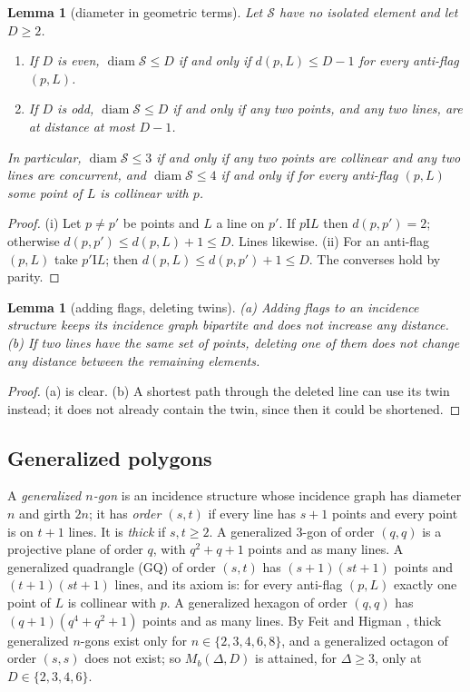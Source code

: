 \documentclass[11pt]{amsart}
\newtheorem{lemma}[theorem]{Lemma}
\theoremstyle{definition}
\theoremstyle{remark}
\numberwithin{equation}{section}
\newcommand{\I}{\mathrel{\mathrm I}}
\newcommand{\Mb}{M_b}
\newcommand{\diam}{\operatorname{diam}}
\newcommand{\cS}{\mathcal S}
\begin{document}
\begin{lemma}[diameter in geometric terms]\label{lem:diamgeom}
Let $\cS$ have no isolated element and let $D\ge2$.
\begin{enumerate}[label=(\roman*)]
\item If $D$ is even, $\diam\cS\le D$ if and only if $d(p,L)\le D-1$ for every anti-flag $(p,L)$.
\item If $D$ is odd, $\diam\cS\le D$ if and only if any two points, and any two lines, are at distance at most $D-1$.
\end{enumerate}
In particular, $\diam\cS\le3$ if and only if any two points are collinear and any two lines are concurrent, and
$\diam\cS\le4$ if and only if for every anti-flag $(p,L)$ some point of $L$ is collinear with $p$.
\end{lemma}

\begin{proof}
(i) Let $p\ne p'$ be points and $L$ a line on $p'$. If $p\I L$ then $d(p,p')=2$; otherwise
$d(p,p')\le d(p,L)+1\le D$. Lines likewise. (ii) For an anti-flag $(p,L)$ take $p'\I L$; then
$d(p,L)\le d(p,p')+1\le D$. The converses hold by parity.
\end{proof}

\begin{lemma}[adding flags, deleting twins]\label{lem:flags}
(a) Adding flags to an incidence structure keeps its incidence graph bipartite and does not increase any distance.
(b) If two lines have the same set of points, deleting one of them does not change any distance between the remaining
elements.
\end{lemma}

\begin{proof}
(a) is clear. (b) A shortest path through the deleted line can use its twin instead; it does not already contain the
twin, since then it could be shortened.
\end{proof}

\subsection{Generalized polygons}
A \emph{generalized $n$-gon} is an incidence structure whose incidence graph has diameter $n$ and girth $2n$; it has
\emph{order $(s,t)$} if every line has $s+1$ points and every point is on $t+1$ lines. It is \emph{thick} if
$s,t\ge2$. A generalized 3-gon of order $(q,q)$ is a projective plane of order $q$, with $q^2+q+1$ points and as many
lines. A generalized quadrangle (GQ) of order $(s,t)$ has $(s+1)(st+1)$ points and $(t+1)(st+1)$ lines, and its axiom
is: for every anti-flag $(p,L)$ exactly one point of $L$ is collinear with $p$. A generalized hexagon of order $(q,q)$
has $(q+1)(q^4+q^2+1)$ points and as many lines. By Feit and Higman \cite{FeitHigman}, thick generalized $n$-gons exist
only for $n\in\{2,3,4,6,8\}$, and a generalized octagon of order $(s,s)$ does not exist; so $\Mb(\Delta,D)$ is attained,
for $\Delta\ge3$, only at $D\in\{2,3,4,6\}$.
\end{document}
